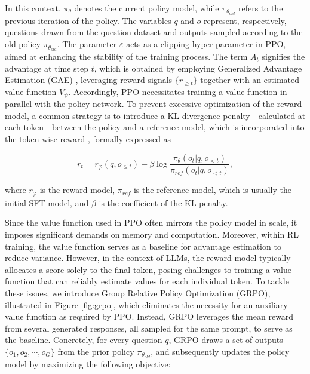 \begin{itemize}[topsep=0pt]
\begin{itemize}[topsep=0pt]
In this context, $\pi_{\theta}$ denotes the current policy model, while $\pi_{\theta_{old}}$ refers to the previous iteration of the policy. The variables $q$ and $o$ represent, respectively, questions drawn from the question dataset and outputs sampled according to the old policy $\pi_{\theta_{old}}$. The parameter $\varepsilon$ acts as a clipping hyper-parameter in PPO, aimed at enhancing the stability of the training process. The term $A_t$ signifies the advantage at time step $t$, which is obtained by employing Generalized Advantage Estimation (GAE) \citep{gae}, leveraging reward signals $\{r_{\ge t}\}$ together with an estimated value function $V_{\psi}$. Accordingly, PPO necessitates training a value function in parallel with the policy network. To prevent excessive optimization of the reward model, a common strategy is to introduce a KL-divergence penalty—calculated at each token—between the policy and a reference model, which is incorporated into the token-wise reward \citep{ouyang2022training}, formally expressed as

\begin{equation}
    r_{t} = r_\varphi(q, o_{\le t}) - \beta \log\frac{\pi_{\theta}(o_{t}|q, o_{<t})}{\pi_{ref}(o_{t}|q, o_{<t})},
\label{eq:PPO-reward}
\end{equation}

where $r_\varphi$  is the reward model, $\pi_{ref}$ is the reference model, which is usually the initial SFT model, and $\beta$  is the coefficient of the KL penalty.

Since the value function used in PPO often mirrors the policy model in scale, it imposes significant demands on memory and computation. Moreover, within RL training, the value function serves as a baseline for advantage estimation to reduce variance. However, in the context of LLMs, the reward model typically allocates a score solely to the final token, posing challenges to training a value function that can reliably estimate values for each individual token. To tackle these issues, we introduce Group Relative Policy Optimization (GRPO), illustrated in Figure \ref{fig:grpo}, which eliminates the necessity for an auxiliary value function as required by PPO. Instead, GRPO leverages the mean reward from several generated responses, all sampled for the same prompt, to serve as the baseline. Concretely, for every question $q$, GRPO draws a set of outputs $\{o_1, o_2, \cdots, o_G\}$ from the prior policy $\pi_{\theta_{old}}$, and subsequently updates the policy model by maximizing the following objective:


\end{itemize}
\end{itemize}
